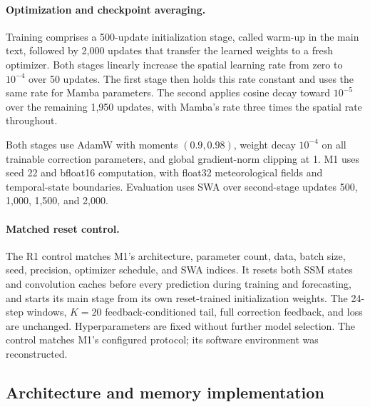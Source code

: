 \documentclass{article}
\newcommand{\vfourchange}[1]{{\color{blue}#1}}
\begin{document}
\paragraph{\vfourchange{Optimization and checkpoint averaging.}}
\vfourchange{Training comprises a 500-update initialization stage, called warm-up in the main text, followed by 2,000 updates that transfer the learned weights to a fresh optimizer. Both stages linearly increase the spatial learning rate from zero to $10^{-4}$ over 50 updates. The first stage then holds this rate constant and uses the same rate for Mamba parameters. The second applies cosine decay toward $10^{-5}$ over the remaining 1,950 updates, with Mamba's rate three times the spatial rate throughout.}

\vfourchange{Both stages use AdamW with moments $(0.9,0.98)$, weight decay $10^{-4}$ on all trainable correction parameters, and global gradient-norm clipping at 1. M1 uses seed 22 and bfloat16 computation, with float32 meteorological fields and temporal-state boundaries. Evaluation uses SWA over second-stage updates 500, 1,000, 1,500, and 2,000.}

\paragraph{\vfourchange{Matched reset control.}}
\vfourchange{The \vfourchange{R1} control matches M1's architecture, parameter count, data, batch size, seed, precision, optimizer schedule, and SWA indices. It resets both SSM states and convolution caches before every prediction during training and forecasting, and starts its main stage from its own reset-trained initialization weights. The 24-step windows, $K=20$ feedback-conditioned tail, full correction feedback, and loss are unchanged. Hyperparameters are fixed without further model selection. The control matches M1's configured protocol; its software environment was reconstructed.}

\subsection{Architecture and memory implementation}
\label{app:architecture_details}
\end{document}
